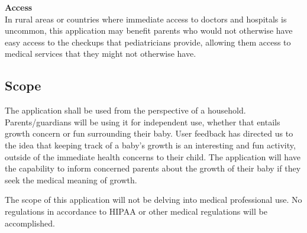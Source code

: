 \documentclass[letterpaper,10pt,draftclsnofoot,onecolumn,compsoc]{IEEEtran}
\begin{document}
\begin{singlespace}
\textbf{Access}\\
In rural areas or countries where immediate access to doctors and hospitals is uncommon, this application may benefit parents who would not otherwise have easy access to the checkups that pediatricians provide, allowing them access to medical services that they might not otherwise have.

\end{singlespace}

\subsection{Scope}

\begin{singlespace}
\noindent
The application shall be used from the perspective of a household. Parents/guardians will be using it for independent use, whether that entails growth concern or fun surrounding their baby. User feedback has directed us to the idea that keeping track of a baby's growth is an interesting and fun activity, outside of the immediate health concerns to their child. The application will have the capability to inform concerned parents about the growth of their baby if they seek the medical meaning of growth.\\ \par

The scope of this application will not be delving into medical professional use. No regulations in accordance to HIPAA or other medical regulations will be accomplished.
\end{singlespace}
\end{document}
